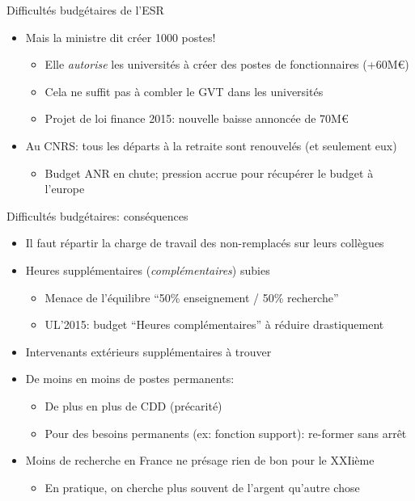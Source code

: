 \documentclass[10pt,final,usepdftitle=false]{beamer}
\begin{document}
\begin{frame}{Difficultés budgétaires de l'ESR}
\begin{itemize}
\item Mais la ministre dit créer 1000 postes!
  \begin{itemize}
  \item Elle \textit{autorise} les universités à créer des postes de
    fonctionnaires (+60M\euro)
  \item Cela ne suffit pas à combler le GVT dans les universités
  \item Projet de loi finance 2015: nouvelle baisse annoncée de 70M\euro{}
  \end{itemize}
\pause
\item Au CNRS: tous les départs à la retraite sont renouvelés (et seulement eux)
  \begin{itemize}
  \item Budget ANR en chute; pression accrue pour récupérer le budget à l'europe
  \end{itemize}
\end{itemize}
\end{frame}

\begin{frame}{Difficultés budgétaires: conséquences}
\begin{itemize}
\item Il faut répartir la charge de travail des non-remplacés sur leurs collègues
\item Heures supplémentaires (\textsl{complémentaires}) subies
  \begin{itemize}
  \item Menace de l'équilibre ``50\% enseignement / 50\% recherche''
  \item UL'2015: budget ``Heures complémentaires'' à réduire drastiquement
  \end{itemize}
\item Intervenants extérieurs supplémentaires à trouver%
\item De moins en moins de postes permanents:
\begin{itemize}
\item De plus en plus de CDD (précarité)
\item Pour des besoins permanents (ex: fonction support): re-former sans arrêt
\end{itemize}
\medskip
\item Moins de recherche en France ne présage rien de bon pour le XXIième
  \begin{itemize}
  \item En pratique, on cherche plus souvent de l'argent qu'autre chose
  \end{itemize}
\end{itemize}
\end{frame}
\end{document}
